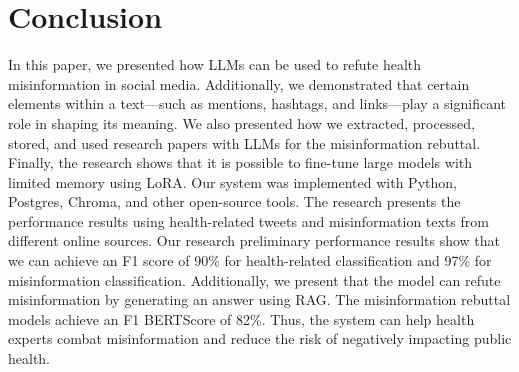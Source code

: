 \section{Conclusion}
In this paper, we presented how LLMs can be used to refute health misinformation in social media. Additionally, we demonstrated that certain elements within a text—such as mentions, hashtags, and links—play a significant role in shaping its meaning. We also presented how we extracted, processed, stored, and used research papers with LLMs for the misinformation rebuttal. Finally, the research shows that it is possible to fine-tune large models with limited memory using LoRA. Our system was implemented with Python, Postgres, Chroma, and other open-source tools. The research presents the performance results using health-related tweets and misinformation texts from different online sources. Our research preliminary performance results show that we can achieve an F1 score of 90\% for health-related classification and 97\% for misinformation classification. Additionally, we present that the model can refute misinformation by generating an answer using RAG. The misinformation rebuttal models achieve an F1 BERTScore of 82\%. Thus, the system can help health experts combat misinformation and reduce the risk of negatively impacting public health.

%
